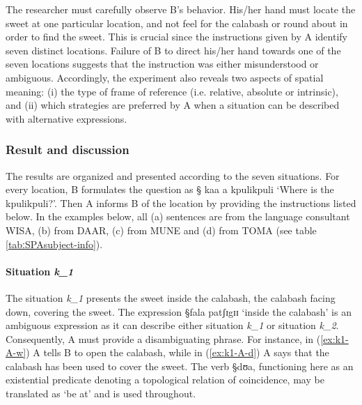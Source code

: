 The researcher must carefully observe B's behavior. His/her hand must  locate
the sweet at one particular location, and not feel for the calabash or round
about in order to find the sweet.  This is crucial since the instructions given
by A identify seven distinct locations. Failure of B to direct his/her hand
towards one of the seven locations suggests that the instruction was either
misunderstood or ambiguous. Accordingly, the experiment also reveals two aspects
of spatial meaning: (i) the type of frame of reference (i.e. relative, absolute
or intrinsic), and (ii) which strategies  are preferred by A when a situation
can be described with alternative expressions.



\subsubsection{Result and discussion}
\label{sec:SPAresult}

The results are organized and presented according to the seven situations. For
every location,   B formulates  the question as {\S
kaa a kpulikpuli} `Where is the kpulikpuli?'. Then  A
 informs  B  of  the location by providing 
the instructions listed below. In the examples  below, all (a)
sentences are from the language consultant WISA, (b) from DAAR, (c) from MUNE
and (d) from TOMA (see table \ref{tabːSPAsubject-info}).





\paragraph{Situation {\it k_{1}}}
\label{sec:SPA-exper1-loca}

The situation {\it  k_{1}}  presents the sweet   inside the calabash, the
calabash facing down, covering the sweet. The expression {\S fala patʃɪgɪɪ}
`inside the calabash' is an ambiguous expression as it can describe either
situation {\it k_{1}} or situation {\it  k_{2}}.  Consequently,  A must provide
a disambiguating phrase. For instance, in (\ref{ex:k1-A-w}) A tells B to open
the calabash, while in (\ref{ex:k1-A-d}) A says that the calabash has been used
to cover the sweet. The verb  {\S dʊa}, functioning here as an existential
predicate denoting a topological relation of coincidence, may be translated as
`be at' and is used throughout.

